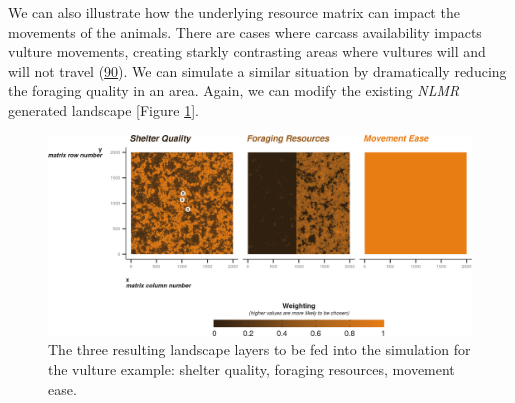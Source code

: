 \documentclass[10pt,a4paper]{article}
\newenvironment{Shaded}{}{}
\newcommand{\DecValTok}[1]{#1}
\newcommand{\FloatTok}[1]{#1}
\newcommand{\NormalTok}[1]{#1}
\newcommand{\OtherTok}[1]{#1}
\newcommand{\SpecialCharTok}[1]{#1}
\begin{document}
We can also illustrate how the underlying resource matrix can impact the movements of the animals.
There are cases where carcass availability impacts vulture movements, creating starkly contrasting areas where vultures will and will not travel (\protect\hyperlink{ref-arrondo_invisible_2018}{90}).
We can simulate a similar situation by dramatically reducing the foraging quality in an area.
Again, we can modify the existing \emph{NLMR} generated landscape {[}Figure \ref{fig:VULTURElayersFigure}{]}.

\begin{Shaded}
\end{Shaded}

\begin{figure}

{\centering \includegraphics{Agent-based_model_walkthrough_files/figure-latex/VULTURElayersFigure-1} 

}

\caption{The three resulting landscape layers to be fed into the simulation for the vulture example: shelter quality, foraging resources, movement ease.}\label{fig:VULTURElayersFigure}
\end{figure}
\end{document}
